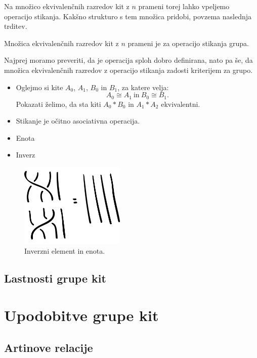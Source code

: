 \documentclass[mat1]{fmfdelo}
\begin{document}
Na množico ekvivalenčnih razredov kit z $n$ prameni torej lahko vpeljemo operacijo stikanja. Kakšno strukturo s tem množica pridobi, povzema naslednja trditev.

\begin{trditev}
Množica ekvivalenčnih razredov kit z $n$ prameni je za operacijo stikanja grupa.
\end{trditev}

\begin{dokaz}
Najprej moramo preveriti, da je operacija sploh dobro definirana, nato pa še, da množica ekvivalenčnih razredov z operacijo stikanja zadosti kriterijem za grupo.
\begin{itemize}
\item{Oglejmo si kite $A_0$, $A_1$, $B_0$ in $B_1$, za katere velja: $$A_0 \cong A_1 \ \text{in} \ B_0 \cong B_1.$$ Pokazati želimo, da sta kiti $A_0*B_0$ in $A_1*A_2$ ekvivalentni. }
\item{Stikanje je očitno asociativna operacija.}
\item{Enota}
\item{Inverz}
\end{itemize}
\end{dokaz}

\begin{figure}[ht!]
\includegraphics[height=4cm]{Inverz_1}
\caption{Inverzni element in enota.}
\end{figure}


\subsection{Lastnosti grupe kit}


\section{Upodobitve grupe kit}

\subsection{Artinove relacije}
\end{document}
